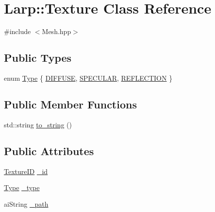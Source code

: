 \hypertarget{classLarp_1_1Texture}{}\section{Larp\+:\+:Texture Class Reference}
\label{classLarp_1_1Texture}


{\ttfamily \#include $<$Mesh.\+hpp$>$}

\subsection*{Public Types}
\begin{DoxyCompactItemize}
\item 
enum \hyperlink{classLarp_1_1Texture_aa4e19b5df6a8f1f0eae8235db7e52daa}{Type} \{ \hyperlink{classLarp_1_1Texture_aa4e19b5df6a8f1f0eae8235db7e52daaa99b3b29878c69b4fc932de604ce39581}{D\+I\+F\+F\+U\+SE}, 
\hyperlink{classLarp_1_1Texture_aa4e19b5df6a8f1f0eae8235db7e52daaa5d8421e01e03aeb7f2911890a0a138b4}{S\+P\+E\+C\+U\+L\+AR}, 
\hyperlink{classLarp_1_1Texture_aa4e19b5df6a8f1f0eae8235db7e52daaa6b6cb64a97445fc87ac1b9c8f43696e2}{R\+E\+F\+L\+E\+C\+T\+I\+ON}
 \}
\end{DoxyCompactItemize}
\subsection*{Public Member Functions}
\begin{DoxyCompactItemize}
\item 
std\+::string \hyperlink{classLarp_1_1Texture_aa5ab3d71dc56dafc3e4620bfaf4e619b}{to\+\_\+string} ()
\end{DoxyCompactItemize}
\subsection*{Public Attributes}
\begin{DoxyCompactItemize}
\item 
\hyperlink{namespaceLarp_a74839f089efb43154cba04bae031c942}{Texture\+ID} \hyperlink{classLarp_1_1Texture_ab033654dd410970e347ea978478bf5d3}{\+\_\+id}
\item 
\hyperlink{classLarp_1_1Texture_aa4e19b5df6a8f1f0eae8235db7e52daa}{Type} \hyperlink{classLarp_1_1Texture_a5db004a6f9355d7c055bbf036b5bc2f4}{\+\_\+type}
\item 
ai\+String \hyperlink{classLarp_1_1Texture_aed77d19ec08af05131aa054df2f937b9}{\+\_\+path}
\end{DoxyCompactItemize}


